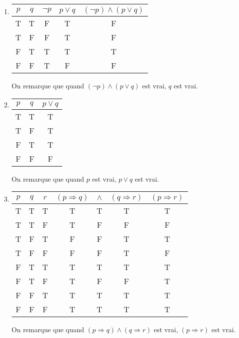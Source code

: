     \begin{enumerate}
    	\item \hspace{1em}

    \begin{center}
	\begin{tabular}{cc|ccc}
		$p$ & $q$ & $\lnot p$ & $p \lor q$ & $(\lnot p) \land (p \lor q)$ \\
		\hline
		T&T&F&T&F\\
		T&F&F&T&F\\
		F&\color{red}T&T&T&\color{red}T\\
		F&F&T&F&F\\
	\end{tabular}
    \end{center}
    
    On remarque que quand $(\lnot p) \land (p \lor q)$ est vrai, $q$ est vrai.
    
	\item  \hspace{1em}
    \begin{center}
    	\begin{tabular}{cc|c}
    		$p$ & $q$ & $p \lor q$ \\
    		\hline
    		\color{red}T&T&\color{red}T\\
    		\color{red}T&F&\color{red}T\\
    		F&T&T\\
    		F&F&F\\
    	\end{tabular}
    \end{center}
    
    On remarque que quand $p$ est vrai, $p \lor q$ est vrai.
    
	\item  \hspace{1em}
    \begin{center}
    	\begin{tabular}{ccc|cccc}
    		$p$ & $q$ & $r$ & $(p \Rightarrow q)$ & $\land$ & $(q \Rightarrow r)$ & $(p \Rightarrow r)$ \\
    		\hline
    		T&T&T&T&\color{red}T&T&\color{red}T\\
    		T&T&F&T&F&F&F\\
    		T&F&T&F&F&T&T\\
    		T&F&F&F&F&T&F\\
    		F&T&T&T&\color{red}T&T&\color{red}T\\
    		F&T&F&T&F&F&T\\
    		F&F&T&T&\color{red}T&T&\color{red}T\\
    		F&F&F&T&\color{red}T&T&\color{red}T\\
    	\end{tabular}
    \end{center}
    
    On remarque que quand $(p \Rightarrow q) \land (q \Rightarrow r)$ est vrai, $(p \Rightarrow r)$ est vrai.
    
    
\end{enumerate}
